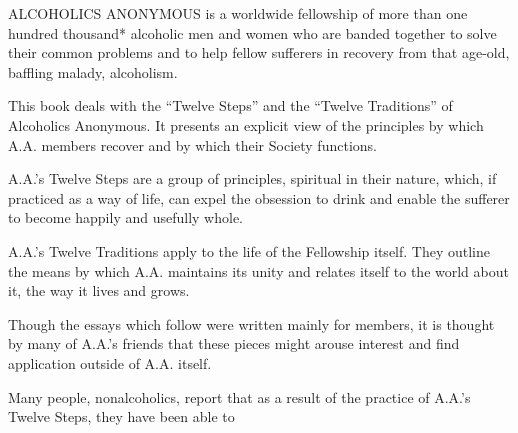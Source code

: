 

\begin{biblechapter}

\verse ALCOHOLICS ANONYMOUS is a worldwide fellowship 
    of more than one hundred thousand* alcoholic men and women 
    who are banded together to solve their common problems 
    and to help fellow sufferers in recovery from
    that age-old, baffling malady, alcoholism.

\verse This  book deals  with  the “Twelve Steps” 
    and the “Twelve Traditions” of Alcoholics Anonymous.
\verse It presents an explicit view of the principles 
    by which A.A. members recover 
    and by which their Society functions.

\verse A.A.'s Twelve Steps are a group of principles, 
    spiritual in their nature, 
    which, if practiced as a way of life, 
    can expel the obsession to drink 
    and enable the sufferer to become happily and usefully whole.

\verse A.A.'s Twelve Traditions apply to the life of the Fellowship itself. 
\verse They outline the means by which A.A. maintains its unity 
    and relates itself to the world about it, 
    the way it lives and grows.

\verse Though the essays which follow were written mainly for members, 
    it is thought by many of A.A.'s friends that these pieces 
    might arouse interest and find application outside of A.A. itself.

\verse Many people, nonalcoholics, 
    report that as a result of the practice of A.A.'s Twelve Steps, 
    they have been able to

\end{biblechapter}

